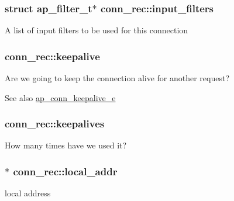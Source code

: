 \subsubsection[{\texorpdfstring{input\+\_\+filters}{input_filters}}]{\setlength{\rightskip}{0pt plus 5cm}struct {\bf ap\+\_\+filter\+\_\+t}$\ast$ conn\+\_\+rec\+::input\+\_\+filters}\hypertarget{structconn__rec_a27bcfa99aac415734fedbb540ab7a3e7}{}\label{structconn__rec_a27bcfa99aac415734fedbb540ab7a3e7}
A list of input filters to be used for this connection 
\subsubsection[{\texorpdfstring{keepalive}{keepalive}}]{ conn\+\_\+rec\+::keepalive}\hypertarget{structconn__rec_a1e310dc6cfa709f96db50472a0d2382b}{}\label{structconn__rec_a1e310dc6cfa709f96db50472a0d2382b}
Are we going to keep the connection alive for another request? \begin{DoxySeeAlso}{See also}
\hyperlink{group__APACHE__CORE__DAEMON_ga0fc39bb8f47f9c1f418f28354416db79}{ap\+\_\+conn\+\_\+keepalive\+\_\+e} 
\end{DoxySeeAlso}
\subsubsection[{\texorpdfstring{keepalives}{keepalives}}]{ conn\+\_\+rec\+::keepalives}\hypertarget{structconn__rec_abe600faf0135f597e31dbdc226b6d622}{}\label{structconn__rec_abe600faf0135f597e31dbdc226b6d622}
How many times have we used it? 
\subsubsection[{\texorpdfstring{local\+\_\+addr}{local_addr}}]{$\ast$ conn\+\_\+rec\+::local\+\_\+addr}\hypertarget{structconn__rec_a221970681f89eb91eaa5ae591b606dd5}{}\label{structconn__rec_a221970681f89eb91eaa5ae591b606dd5}
local address 
